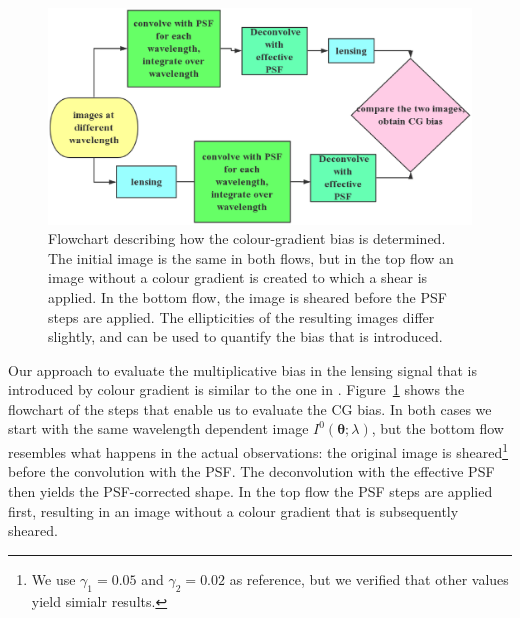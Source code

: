 \documentclass[useAMS,usenatbib]{mnras}
\begin{document}
%
\begin{figure}
\includegraphics[width=12.5cm]{colourg.eps}
\caption{Flowchart describing how the colour-gradient bias is determined. The initial image
is the same in both flows, but in the top flow an image without a colour gradient is created
to which a shear is applied. In the bottom flow, the image is sheared before the PSF steps
are applied. The ellipticities of the resulting images differ slightly, and can be used to quantify
the bias that is introduced.}
\label{fig:flowchart}
\end{figure}
%

Our approach to evaluate the multiplicative bias in the lensing signal that is introduced by colour gradient is similar to the one in . Figure~\ref{fig:flowchart} shows the flowchart of the steps that enable us to evaluate the CG bias.  In both cases we start with the same wavelength dependent image $I^0({\bm \theta};\lambda)$, but the bottom flow resembles what happens in the actual observations: the original image is sheared\footnote{We use 
$\gamma_1=0.05$  and $\gamma_2=0.02$ as reference, but we verified that other values yield simialr results.} before the convolution with the PSF. The deconvolution with the effective PSF then yields the PSF-corrected shape. In the top flow the PSF steps are applied first, resulting in an image without a colour gradient that is subsequently sheared.
\end{document}
